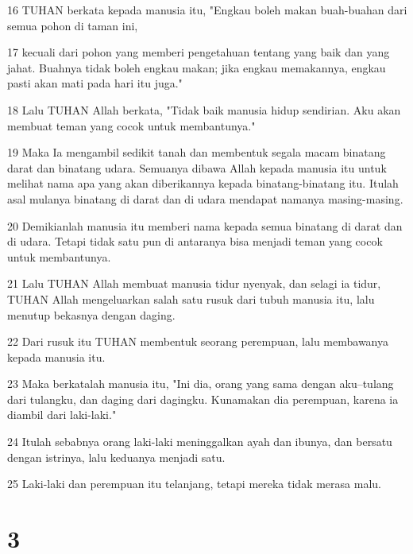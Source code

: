 \par 16 TUHAN berkata kepada manusia itu, "Engkau boleh makan buah-buahan dari semua pohon di taman ini,
\par 17 kecuali dari pohon yang memberi pengetahuan tentang yang baik dan yang jahat. Buahnya tidak boleh engkau makan; jika engkau memakannya, engkau pasti akan mati pada hari itu juga."
\par 18 Lalu TUHAN Allah berkata, "Tidak baik manusia hidup sendirian. Aku akan membuat teman yang cocok untuk membantunya."
\par 19 Maka Ia mengambil sedikit tanah dan membentuk segala macam binatang darat dan binatang udara. Semuanya dibawa Allah kepada manusia itu untuk melihat nama apa yang akan diberikannya kepada binatang-binatang itu. Itulah asal mulanya binatang di darat dan di udara mendapat namanya masing-masing.
\par 20 Demikianlah manusia itu memberi nama kepada semua binatang di darat dan di udara. Tetapi tidak satu pun di antaranya bisa menjadi teman yang cocok untuk membantunya.
\par 21 Lalu TUHAN Allah membuat manusia tidur nyenyak, dan selagi ia tidur, TUHAN Allah mengeluarkan salah satu rusuk dari tubuh manusia itu, lalu menutup bekasnya dengan daging.
\par 22 Dari rusuk itu TUHAN membentuk seorang perempuan, lalu membawanya kepada manusia itu.
\par 23 Maka berkatalah manusia itu, "Ini dia, orang yang sama dengan aku--tulang dari tulangku, dan daging dari dagingku. Kunamakan dia perempuan, karena ia diambil dari laki-laki."
\par 24 Itulah sebabnya orang laki-laki meninggalkan ayah dan ibunya, dan bersatu dengan istrinya, lalu keduanya menjadi satu.
\par 25 Laki-laki dan perempuan itu telanjang, tetapi mereka tidak merasa malu.

\chapter{3}

